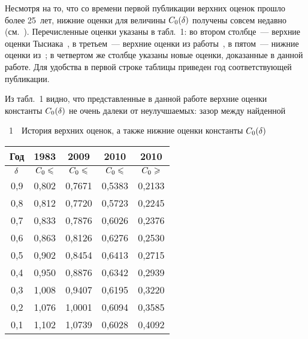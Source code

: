 \begin{multicols}{2}
Несмотря на то, что со времени первой публикации верхних оценок
прошло более 25~лет, нижние оценки для величины $C_0(\delta)$ получены
совсем недавно (см.~\cite{Shevtsova2010}). Перечисленные
оценки указаны в табл.~1: во втором
столбце~--- верхние оценки Тысиака~\cite{Tysiak1983}, в третьем~---
верхние оценки из работы~\cite{GaponovaKorchaginShevtsova2009}, в
пятом~--- нижние оценки из~\cite{Shevtsova2010}; в четвертом же
столбце указаны новые оценки, доказанные в данной работе. Для
удобства в первой строке таблицы приведен год соответствующей
публикации.


Из табл.~1 видно, что представленные в данной работе верхние оценки
константы $C_0(\delta)$ не очень далеки от неулучшаемых: зазор между
найденной\linebreak\vspace*{-12pt}
\columnbreak


\noindent
{{\tablename~1}\ \ \small{История верхних оценок, а также нижние оценки
константы $C_0(\delta)$}}
\vspace*{2pt}

{\small \begin{center}
\tabcolsep=11.8pt
\begin{tabular}{|c|c|c|c|c|}
\hline
Год & 1983  & 2009 & 2010 &   2010  \\
\hline
$\delta$ & $C_0 \leqslant$ & $C_0\leqslant$ & $C_0\leqslant$ & $C_0\geqslant$ \\
\hline
0,9 & 0,802  & 0,7671 & 0,5383 &   0,2133  \\
0,8 & 0,812  & 0,7720 & 0,5723 &   0,2245  \\
0,7 & 0,833  & 0,7876 & 0,6026 &   0,2376  \\
0,6 & 0,863  & 0,8126 & 0,6276 &   0,2530  \\
0,5 & 0,902  & 0,8454 & 0,6413 &   0,2715  \\
0,4 & 0,950  & 0,8876 & 0,6342 &   0,2939  \\
0,3 & 1,008  & 0,9407 & 0,6195 &   0,3220  \\
0,2 & 1,076  & 1,0001 & 0,6094 &   0,3585  \\
0,1 & 1,102  & 1,0739 & 0,6028 &   0,4092  \\
\hline
\end{tabular}
\end{center}
}


\bigskip


\end{multicols}
